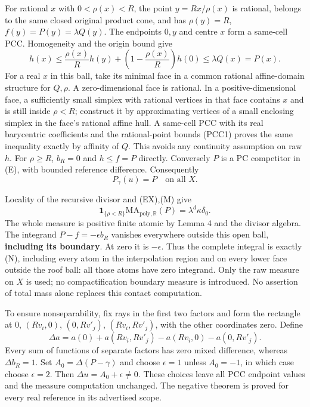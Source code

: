 \documentclass[
  11pt,
]{article}
\begin{document}
For rational \(x\) with \(0<\rho(x)<R\), the point \(y=Rx/\rho(x)\) is
rational, belongs to the same closed original product cone, and has
\(\rho(y)=R\), \(f(y)=P(y)=\lambda Q(y)\). The endpoints \(0,y\) and
centre \(x\) form a same-cell PCC. Homogeneity and the origin bound give
\[
h(x)\leq\frac{\rho(x)}R h(y)+\left(1-\frac{\rho(x)}R\right)h(0)
\leq\lambda Q(x)=P(x).
\tag{PCC1}
\] For a real \(x\) in this ball, take its minimal face in a common
rational affine-domain structure for \(Q,\rho\). A zero-dimensional face
is rational. In a positive-dimensional face, a sufficiently small
simplex with rational vertices in that face contains \(x\) and is still
inside \(\rho<R\); construct it by approximating vertices of a small
enclosing simplex in the face's rational affine hull. A same-cell PCC
with its real barycentric coefficients and the rational-point bounds
(PCC1) proves the same inequality exactly by affinity of \(Q\). This
avoids any continuity assumption on raw \(h\). For \(\rho\geq R\),
\(b_R=0\) and \(h\leq f=P\) directly. Conversely \(P\) is a PC
competitor in (E), with bounded reference difference. Consequently \[
P_\gamma(u)=P\quad\text{on all }X.
\tag{EP}
\]

Locality of the recursive divisor and (EX),(M) give \[
\mathbf1_{\{\rho<R\}}\mathrm{MA}_{\mathrm{poly},\mathbb R}(P)
=\lambda^d\kappa\delta_0.
\] The whole measure is positive finite atomic by Lemma 4 and the
divisor algebra. The integrand \(P-f=-\epsilon b_R\) vanishes everywhere
outside this open ball, \textbf{including its boundary}. At zero it is
\(-\epsilon\). Thus the complete integral is exactly (N), including
every atom in the interpolation region and on every lower face outside
the roof ball: all those atoms have zero integrand. Only the raw measure
on \(X\) is used; no compactification boundary measure is introduced. No
assertion of total mass alone replaces this contact computation.

To ensure nonseparability, fix rays in the first two factors and form
the rectangle at \(0\), \((Rv_i,0)\), \((0,Rv'_j)\), \((Rv_i,Rv'_j)\),
with the other coordinates zero. Define \[
\Delta a=a(0)+a(Rv_i,Rv'_j)-a(Rv_i,0)-a(0,Rv'_j).
\] Every sum of functions of separate factors has zero mixed difference,
whereas \(\Delta b_R=1\). Set \(A_0=\Delta(P-\gamma)\) and choose
\(\epsilon=1\) unless \(A_0=-1\), in which case choose \(\epsilon=2\).
Then \(\Delta u=A_0+\epsilon\ne0\). These choices leave all PCC endpoint
values and the measure computation unchanged. The negative theorem is
proved for every real reference in its advertised scope.
\end{document}
